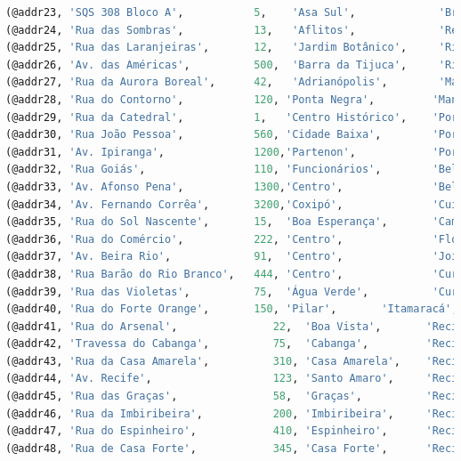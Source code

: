\documentclass[12pt,a4paper]{report}
\begin{document}
\begin{lstlisting}[language=SQL, caption=population.sql]
(@addr23, 'SQS 308 Bloco A',           5,    'Asa Sul',             'Brasília',      'DF', '70355-010'),
(@addr24, 'Rua das Sombras',           13,   'Aflitos',             'Recife',        'PE', '50050-000'),
(@addr25, 'Rua das Laranjeiras',       12,   'Jardim Botânico',     'Rio de Janeiro','RJ','22460-240'),
(@addr26, 'Av. das Américas',          500,  'Barra da Tijuca',     'Rio de Janeiro','RJ','22640-904'),
(@addr27, 'Rua da Aurora Boreal',      42,   'Adrianópolis',        'Manaus',        'AM', '69057-770'),
(@addr28, 'Rua do Contorno',           120, 'Ponta Negra',         'Manaus',        'AM', '69037-000'),
(@addr29, 'Rua da Catedral',           1,   'Centro Histórico',    'Porto Alegre',  'RS', '91120-460'),
(@addr30, 'Rua João Pessoa',           560, 'Cidade Baixa',        'Porto Alegre',  'RS', '90040-000'),
(@addr31, 'Av. Ipiranga',              1200,'Partenon',            'Porto Alegre',  'RS', '90610-001'),
(@addr32, 'Rua Goiás',                 110, 'Funcionários',        'Belo Horizonte','MG','30190-030'),
(@addr33, 'Av. Afonso Pena',           1300,'Centro',              'Belo Horizonte','MG','30130-003'),
(@addr34, 'Av. Fernando Corrêa',       3200,'Coxipó',              'Cuiabá',        'MT', '78085-000'),
(@addr35, 'Rua do Sol Nascente',       15,  'Boa Esperança',       'Campo Grande',  'MS', '79080-290'),
(@addr36, 'Rua do Comércio',           222, 'Centro',              'Florianópolis', 'SC', '88010-000'),
(@addr37, 'Av. Beira Rio',             91,  'Centro',              'Joinville',     'SC', '89201-000'),
(@addr38, 'Rua Barão do Rio Branco',   444, 'Centro',              'Curitiba',      'PR', '80010-000'),
(@addr39, 'Rua das Violetas',          75,  'Água Verde',          'Curitiba',      'PR', '80240-320'),
(@addr40, 'Rua do Forte Orange',       150, 'Pilar',       'Itamaracá',        'PE', '53900-000'),
(@addr41, 'Rua do Arsenal',               22,  'Boa Vista',       'Recife',    'PE', '50030-360'),
(@addr42, 'Travessa do Cabanga',          75,  'Cabanga',         'Recife',    'PE', '50090-280'),
(@addr43, 'Rua da Casa Amarela',          310, 'Casa Amarela',    'Recife',    'PE', '52070-180'),
(@addr44, 'Av. Recife',                   123, 'Santo Amaro',     'Recife',    'PE', '50100-140'),
(@addr45, 'Rua das Graças',               58,  'Graças',          'Recife',    'PE', '52011-020'),
(@addr46, 'Rua da Imbiribeira',           200, 'Imbiribeira',     'Recife',    'PE', '51130-220'),
(@addr47, 'Rua do Espinheiro',            410, 'Espinheiro',      'Recife',    'PE', '52020-000'),
(@addr48, 'Rua de Casa Forte',            345, 'Casa Forte',      'Recife',    'PE', '52060-330'),

\end{lstlisting}
\end{document}
